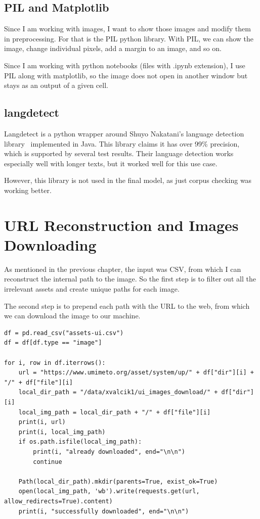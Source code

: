 \documentclass[
  digital,     %
  oneside,     %
  nosansbold,  %
  nocolorbold, %
  nolof,         %
  nolot,         %
]{fithesis4}
\begin{document}
\subsection{PIL and Matplotlib}

Since I am working with images, I want to show those images and modify them in preprocessing. For that is the PIL python library. With PIL, we can show the image, change individual pixels, add a margin to an image, and so on.

Since I am working with python notebooks (files with .ipynb extension), I use PIL along with matplotlib, so the image does not open in another window but stays as an output of a given cell.

\subsection{langdetect}

Langdetect is a python wrapper around Shuyo Nakatani's language detection library~\cite{nakatani2010langdetect} implemented in Java. This library claims it has over 99\% precision, which is supported by several test results. Their language detection works especially well with longer texts, but it worked well for this use case.

However, this library is not used in the final model, as just corpus checking was working better.

\section{URL Reconstruction and Images Downloading}

As mentioned in the previous chapter, the input was CSV, from which I can reconstruct the internal path to the image. So the first step is to filter out all the irrelevant assets and create unique paths for each image.

The second step is to prepend each path with the URL to the web, from which we can download the image to our machine.

\begin{verbatim}
df = pd.read_csv("assets-ui.csv")
df = df[df.type == "image"]

for i, row in df.iterrows():
    url = "https://www.umimeto.org/asset/system/up/" + df["dir"][i] + "/" + df["file"][i]
    local_dir_path = "/data/xvalcik1/ui_images_download/" + df["dir"][i]
    local_img_path = local_dir_path + "/" + df["file"][i]
    print(i, url)
    print(i, local_img_path)
    if os.path.isfile(local_img_path):
        print(i, "already downloaded", end="\n\n")
        continue

    Path(local_dir_path).mkdir(parents=True, exist_ok=True)
    open(local_img_path, 'wb').write(requests.get(url, allow_redirects=True).content)
    print(i, "successfully downloaded", end="\n\n")
\end{verbatim}
\end{document}
